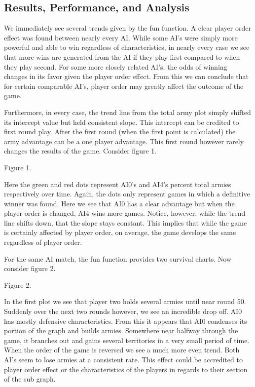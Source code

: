 \documentclass[12pt]{article}  %
\begin{document}
\subsection{Results, Performance, and Analysis }
We immediately see several trends given by the fun function. A clear player order effect was found between nearly every AI. While some AI’s were simply more powerful and able to win regardless of characteristics, in nearly every case we see that more wins are generated from the AI if they play first compared to when they play second. For some more closely related AI’s, the odds of winning changes in its favor given the player order effect. From this we can conclude that for certain comparable AI’s, player order may greatly affect the outcome of the game. 

Furthermore, in every case, the trend line from the total army plot simply shifted its intercept value but held consistent slope. This intercept can be credited to first round play. After the first round (when the first point is calculated) the army advantage can be a one player advantage. This first round however rarely changes the results of the game. Consider figure 1. 

\begin{center}
{\footnotesize Figure 1.}
\end{center}

Here the green and red dots represent AI0’s and AI4’s percent total armies respectively over time. Again, the dots only represent games in which a definitive winner was found. Here we see that AI0 has a clear advantage but when the player order is changed, AI4 wins more games. Notice, however, while the trend line shifts down, that the slope stays constant. This implies that while the game is certainly affected by player order, on average, the game develops the same regardless of player order. 

For the same AI match, the fun function provides two survival charts. Now consider figure 2. 


\begin{center}
{\footnotesize Figure 2.}
\end{center}

In the first plot we see that player two holds several armies until near round 50. Suddenly over the next two rounds however, we see an incredible drop off. AI0 has mostly defensive characteristics. From this it appears that AI0 condenses its portion of the graph and builds armies. Somewhere near halfway through the game, it branches out and gains several territories in a very small period of time. When the order of the game is reversed we see a much more even trend. Both AI’s seem to lose armies at a consistent rate. This effect could be accredited to player order effect or the characteristics of the players in regards to their section of the sub graph. 
\end{document}
